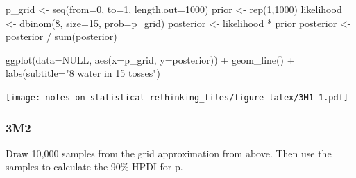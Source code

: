 \documentclass[
]{book}
\newenvironment{Shaded}{\begin{snugshade}}{\end{snugshade}}
\newcommand{\AttributeTok}[1]{\textcolor[rgb]{0.77,0.63,0.00}{#1}}
\newcommand{\ConstantTok}[1]{\textcolor[rgb]{0.00,0.00,0.00}{#1}}
\newcommand{\DecValTok}[1]{\textcolor[rgb]{0.00,0.00,0.81}{#1}}
\newcommand{\FunctionTok}[1]{\textcolor[rgb]{0.00,0.00,0.00}{#1}}
\newcommand{\NormalTok}[1]{#1}
\newcommand{\OtherTok}[1]{\textcolor[rgb]{0.56,0.35,0.01}{#1}}
\newcommand{\SpecialCharTok}[1]{\textcolor[rgb]{0.00,0.00,0.00}{#1}}
\newcommand{\StringTok}[1]{\textcolor[rgb]{0.31,0.60,0.02}{#1}}
\begin{document}
\begin{Shaded}
\begin{Highlighting}[]
\NormalTok{p\_grid }\OtherTok{\textless{}{-}} \FunctionTok{seq}\NormalTok{(}\AttributeTok{from=}\DecValTok{0}\NormalTok{, }\AttributeTok{to=}\DecValTok{1}\NormalTok{, }\AttributeTok{length.out=}\DecValTok{1000}\NormalTok{)}
\NormalTok{prior }\OtherTok{\textless{}{-}} \FunctionTok{rep}\NormalTok{(}\DecValTok{1}\NormalTok{,}\DecValTok{1000}\NormalTok{)}
\NormalTok{likelihood }\OtherTok{\textless{}{-}} \FunctionTok{dbinom}\NormalTok{(}\DecValTok{8}\NormalTok{, }\AttributeTok{size=}\DecValTok{15}\NormalTok{, }\AttributeTok{prob=}\NormalTok{p\_grid)}
\NormalTok{posterior }\OtherTok{\textless{}{-}}\NormalTok{ likelihood }\SpecialCharTok{*}\NormalTok{ prior}
\NormalTok{posterior }\OtherTok{\textless{}{-}}\NormalTok{ posterior }\SpecialCharTok{/} \FunctionTok{sum}\NormalTok{(posterior)}

\FunctionTok{ggplot}\NormalTok{(}\AttributeTok{data=}\ConstantTok{NULL}\NormalTok{, }\FunctionTok{aes}\NormalTok{(}\AttributeTok{x=}\NormalTok{p\_grid, }\AttributeTok{y=}\NormalTok{posterior)) }\SpecialCharTok{+} 
  \FunctionTok{geom\_line}\NormalTok{() }\SpecialCharTok{+}
  \FunctionTok{labs}\NormalTok{(}\AttributeTok{subtitle=}\StringTok{"8 water in 15 tosses"}\NormalTok{)}
\end{Highlighting}
\end{Shaded}

\texttt{[image: notes-on-statistical-rethinking\_files/figure-latex/3M1-1.pdf]}

\hypertarget{m2-1}{%
\subsubsection*{3M2}\label{m2-1}}

Draw 10,000 samples from the grid approximation from above. Then use the samples to calculate the 90\% HPDI for p.
\end{document}

